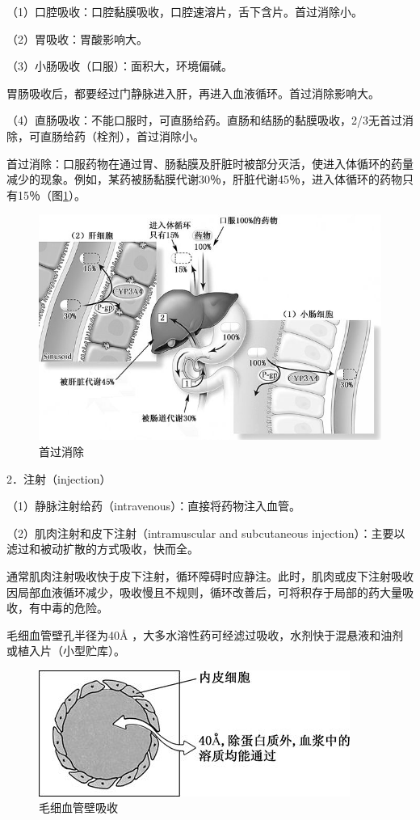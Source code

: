 （1）口腔吸收：口腔黏膜吸收，口腔速溶片，舌下含片。首过消除小。

（2）胃吸收：胃酸影响大。

（3）小肠吸收（口服）：面积大，环境偏碱。

胃肠吸收后，都要经过门静脉进入肝，再进入血液循环。首过消除影响大。

（4）直肠吸收：不能口服时，可直肠给药。直肠和结肠的黏膜吸收，2/3无首过消除，可直肠给药（栓剂），首过消除小。

首过消除：口服药物在通过胃、肠黏膜及肝脏时被部分灭活，使进入体循环的药量减少的现象。例如，某药被肠黏膜代谢30％，肝脏代谢45％，进入体循环的药物只有15％（图\ref{fig3-6}）。

\begin{figure}[!htbp]
 \centering
 \includegraphics{./images/Image00032.jpg}
 \captionsetup{justification=centering}
 \caption{首过消除}
 \label{fig3-6}
  \end{figure} 

2．注射（injection）

（1）静脉注射给药（intravenous）：直接将药物注入血管。

（2）肌肉注射和皮下注射（intramuscular and subcutaneous
injection）：主要以滤过和被动扩散的方式吸收，快而全。

通常肌肉注射吸收快于皮下注射，循环障碍时应静注。此时，肌肉或皮下注射吸收因局部血液循环减少，吸收慢且不规则，循环改善后，可将积存于局部的药大量吸收，有中毒的危险。

毛细血管壁孔半径为40\AA
，大多水溶性药可经滤过吸收，水剂快于混悬液和油剂或植入片（小型贮库）。

\begin{figure}[!htbp]
 \centering
 \includegraphics{./images/Image00034.jpg}
 \captionsetup{justification=centering}
 \caption{毛细血管壁吸收}
 \label{fig3-7}
  \end{figure} 

